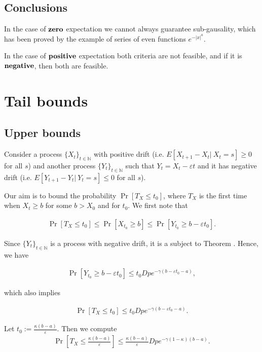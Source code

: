 \documentclass[12pt, a4paper]{article}
\theoremstyle{remark}
\newcommand{\expx}[1]{e^{-|x|^{#1}}}
\begin{document}
\subsection*{Conclusions}

In the case of $\textbf{\text{zero}}$ expectation we cannot always guarantee sub-gausality, which has been proved by the example of series of even functions $\expx{a}$.

In the case of $\textbf{\text{positive}}$ expectation both criteria are not feasible, and if it is $\textbf{\text{negative}}$, then both are feasible.

\section{Tail bounds}
\subsection{Upper bounds}
Consider a process $\{X_t\}_{t \in \mathbb{N}}$ with positive drift (i.e. $E[X_{t + 1} - X_t |\ X_t = s] \geq 0$ for all $s$) and another process $\{Y_t\}_{t \in \mathbb{N}}$ such that $Y_t = X_t - \varepsilon t$ and it has negative drift (i.e. $E[Y_{t + 1} - Y_t |\ Y_t = s] \leq 0$ for all $s$).

Our aim is to bound the probability $\Pr[T_X \leq t_0]$, where $T_X$ is the first time when $X_t \geq b$ for some $b > X_0$ and for $t_0$. We first note that

\begin{align*}
    \Pr[T_X \leq t_0] \leq \Pr[X_{t_0} \geq b] \leq \Pr[Y_{t_0} \geq b - \varepsilon t_0].
\end{align*}

Since $\{Y_t\}_{t \in \mathbb{N}}$ is a process with negative drift, it is a subject to Theorem \cite{}. Hence, we have

\begin{align*}
    \Pr[Y_{t_0} \geq b - \varepsilon t_0] \leq t_0 D p e^{-\gamma(b - \varepsilon t_0 - a)},
\end{align*}

which also implies

\begin{align*}
    \Pr[T_X \leq t_0] \leq t_0 D p e^{-\gamma(b - \varepsilon t_0 - a)}.
\end{align*}

Let $t_0 := \frac{\kappa (b - a)}{\varepsilon}$. Then we compute
\begin{align*}
    \Pr\left[T_X \leq \frac{\kappa (b - a)}{\varepsilon}\right] \leq \frac{\kappa (b - a)}{\varepsilon} D p e^{-\gamma(1 - \kappa)(b - a)}.
\end{align*}
\end{document}
